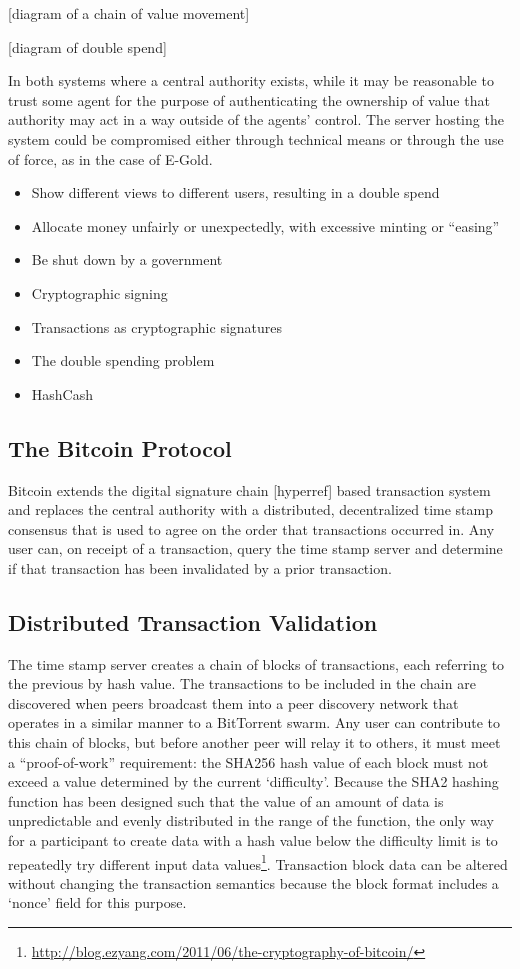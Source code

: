 [diagram of a chain of value movement]

[diagram of double spend]

In both systems where a central authority exists, while it may be reasonable to
trust some agent for the purpose of authenticating the ownership of value that
authority may act in a way outside of the agents’ control.  The server hosting
the system could be compromised either through technical means or through the
use of force, as in the case of E-Gold.

\begin{itemize} \item Show different views to different users, resulting in a
        double spend \item Allocate money unfairly or unexpectedly, with
        excessive minting or ``easing'' \item Be shut down by a government \item
        Cryptographic signing \item Transactions as cryptographic signatures
        \item The double spending problem \item HashCash \end{itemize}

\subsection{The Bitcoin Protocol} Bitcoin extends the digital signature chain
[hyperref] based transaction system and replaces the central authority with a
distributed, decentralized time stamp consensus that is used to agree on the
order that transactions occurred in.  Any user can, on receipt of a transaction,
query the time stamp server and determine if that transaction has been
invalidated by a prior transaction.

\subsection{Distributed Transaction Validation}
The time stamp server creates a chain of blocks of transactions, each referring
to the previous by hash value.  The transactions to be included in the chain are
discovered when peers broadcast them into a peer discovery network that operates
in a similar manner to a BitTorrent swarm.  Any user can contribute to this
chain of blocks, but before another peer will relay it to others, it must meet a
``proof-of-work'' requirement: the SHA256 hash value of each block must not
exceed a value determined by the current ‘difficulty’.  Because the SHA2 hashing
function has been designed such that the value of an amount of data is
unpredictable and evenly distributed in the range of the function, the only way
for a participant to create data with a hash value below the difficulty limit is
to repeatedly try different input data
values\footnote{\url{http://blog.ezyang.com/2011/06/the-cryptography-of-bitcoin/}}.
Transaction block data can be altered without changing the transaction semantics
because the block format includes a ‘nonce’ field for this purpose.

